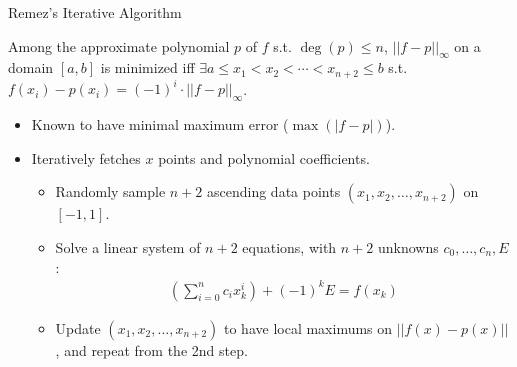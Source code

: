 \documentclass[9pt]{beamer}
\begin{document}
\begin{frame}{Remez's Iterative Algorithm}
    \begin{theorem}
        Among the approximate polynomial $p$ of $f$ s.t. $\deg(p) \leq n$,
        $||f-p||_\infty$ on a domain $[a, b]$ is minimized iff $\exists a \leq x_1 < x_2 < \cdots < x_{n+2} \leq b$
        s.t. $f(x_i) - p(x_i) = (-1)^i \cdot ||f-p||_\infty$.
    \end{theorem}
    \begin{itemize}
        \item \alert{Known to have minimal maximum error ($\max(|f-p|)$).}
        \item Iteratively fetches $x$ points and polynomial coefficients.
              \begin{itemize}
                  \item Randomly sample $n+2$ ascending data points $(x_1, x_2, \dots, x_{n+2})$ on $[-1, 1]$.
                  \item Solve a linear system of $n+2$ equations, with $n+2$ unknowns $c_0, \dots, c_n, E$:
                        \begin{gather*}
                            \left( \sum_{i=0}^n c_i x_k^i \right) + (-1)^k E = f(x_k)
                        \end{gather*}
                  \item Update $(x_1, x_2, \dots, x_{n+2})$ to have local maximums on $||f(x) - p(x)||$, and repeat from the 2nd step.
              \end{itemize}
    \end{itemize}
\end{frame}
\end{document}
